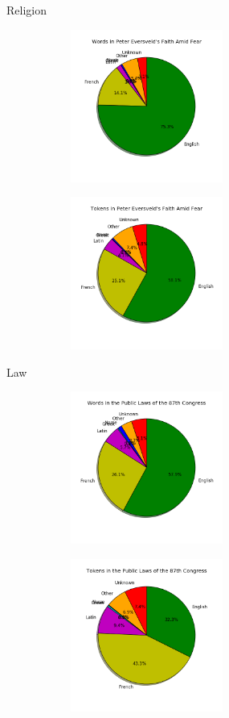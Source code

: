 \documentclass[10pt]{beamer}
\begin{document}
\begin{frame}[fragile]{Religion}

  \begin{figure}
  \centering
  \begin{subfigure}
  \centering
    \includegraphics[width=5cm]{religionwords.png}
  \end{subfigure}
  \begin{subfigure}
  \centering
    \includegraphics[width=5cm]{religiontokens.png}
  \end{subfigure}
  \end{figure}
\end{frame}

\begin{frame}[fragile]{Law}

  \begin{figure}
  \centering
  \begin{subfigure}
  \centering
    \includegraphics[width=5cm]{lawwords.png}
  \end{subfigure}
  \begin{subfigure}
  \centering
    \includegraphics[width=5cm]{lawtokens.png}
  \end{subfigure}
  \end{figure}
\end{frame}
\end{document}
